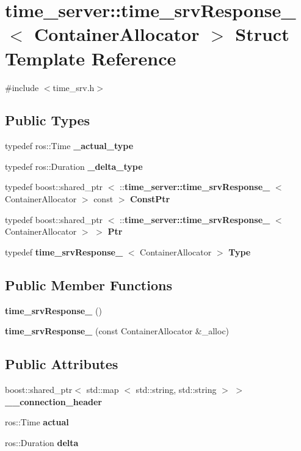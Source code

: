 \section{time\-\_\-server\-:\-:time\-\_\-srv\-Response\-\_\-$<$ \-Container\-Allocator $>$ \-Struct \-Template \-Reference}
\label{structtime__server_1_1time__srvResponse__}


{\ttfamily \#include $<$time\-\_\-srv.\-h$>$}

\subsection*{\-Public \-Types}
\begin{DoxyCompactItemize}
\item 
typedef ros\-::\-Time {\bf \-\_\-actual\-\_\-type}
\item 
typedef ros\-::\-Duration {\bf \-\_\-delta\-\_\-type}
\item 
typedef boost\-::shared\-\_\-ptr\*
$<$ \-::{\bf time\-\_\-server\-::time\-\_\-srv\-Response\-\_\-}\*
$<$ \-Container\-Allocator $>$ const  $>$ {\bf \-Const\-Ptr}
\item 
typedef boost\-::shared\-\_\-ptr\*
$<$ \-::{\bf time\-\_\-server\-::time\-\_\-srv\-Response\-\_\-}\*
$<$ \-Container\-Allocator $>$ $>$ {\bf \-Ptr}
\item 
typedef {\bf time\-\_\-srv\-Response\-\_\-}\*
$<$ \-Container\-Allocator $>$ {\bf \-Type}
\end{DoxyCompactItemize}
\subsection*{\-Public \-Member \-Functions}
\begin{DoxyCompactItemize}
\item 
{\bf time\-\_\-srv\-Response\-\_\-} ()
\item 
{\bf time\-\_\-srv\-Response\-\_\-} (const \-Container\-Allocator \&\-\_\-alloc)
\end{DoxyCompactItemize}
\subsection*{\-Public \-Attributes}
\begin{DoxyCompactItemize}
\item 
boost\-::shared\-\_\-ptr$<$ std\-::map\*
$<$ std\-::string, std\-::string $>$ $>$ {\bf \-\_\-\-\_\-connection\-\_\-header}
\item 
ros\-::\-Time {\bf actual}
\item 
ros\-::\-Duration {\bf delta}
\end{DoxyCompactItemize}


